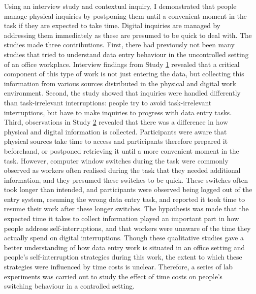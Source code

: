 Using an interview study and contextual inquiry, I demonstrated that people manage physical inquiries by postponing them until a convenient moment in the task if they are expected to take time. Digital inquiries are managed by addressing them immediately as these are presumed to be quick to deal with.
The studies made three contributions. First, there had previously not been many studies that tried to understand data entry behaviour in the uncontrolled setting of an office workplace. Interview findings from Study \hyperref[st:Study1]{1} revealed that a critical component of this type of work is not just entering the data, but collecting this information from various sources distributed in the physical and digital work environment. Second, the study showed that inquiries were handled differently than task-irrelevant interruptions: people try to avoid task-irrelevant interruptions, but have to make inquiries to progress with data entry tasks. Third, observations in Study \hyperref[st:Study2]{2} revealed that there was a difference in how physical and digital information is collected. Participants were aware that physical sources take time to access and participants therefore prepared it beforehand, or postponed retrieving it until a more convenient moment in the task. However, computer window switches during the task were commonly observed as workers often realised during the task that they needed additional information, and they presumed these switches to be quick. These switches often took longer than intended, and participants were observed being logged out of the entry system, resuming the wrong data entry task, and reported it took time to resume their work after these longer switches. The hypothesis was made that the expected time it takes to collect information played an important part in how people address self-interruptions, and that workers were unaware of the time they actually spend on digital interruptions. Though these qualitative studies gave a better understanding of how data entry work is situated in an office setting and people's self-interruption strategies during this work, the extent to which these strategies were influenced by time costs is unclear. Therefore, a series of lab experiments was carried out to study the effect of time costs on people's switching behaviour in a controlled setting.

